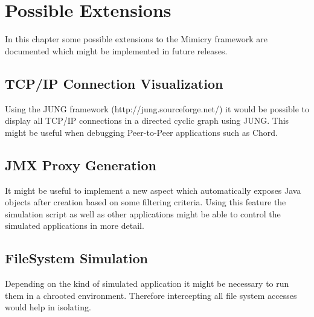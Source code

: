 \documentclass[a4paper,oneside]{book}
\begin{document}
\chapter{Possible Extensions}
In this chapter some possible extensions to the Mimicry framework are documented which might be implemented in future releases.

\section{TCP/IP Connection Visualization}
Using the JUNG framework (http://jung.sourceforge.net/) it would be possible to display all TCP/IP connections in a directed cyclic graph using JUNG. This might be useful when debugging Peer-to-Peer applications such as Chord.

\section{JMX Proxy Generation}
It might be useful to implement a new aspect which automatically exposes Java objects after creation based on some filtering criteria. Using this feature the simulation script as well as other applications might be able to control the simulated applications in more detail.

\section{FileSystem Simulation}
Depending on the kind of simulated application it might be necessary to run them in a chrooted environment. Therefore intercepting all file system accesses would help in isolating.



\end{document}
